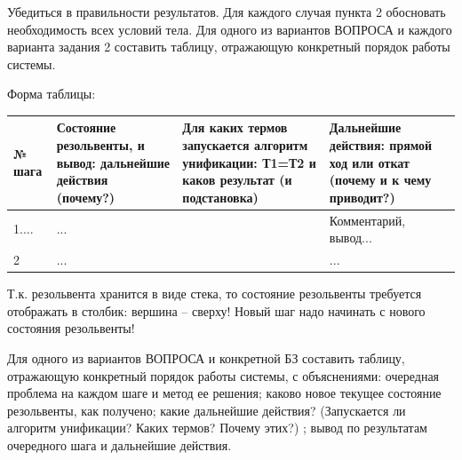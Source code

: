 Убедиться в правильности результатов. Для каждого случая пункта 2 обосновать необходимость всех условий тела.
Для одного из вариантов ВОПРОСА и каждого варианта задания 2 составить таблицу, отражающую конкретный порядок работы системы.

Форма таблицы:
\begin{tabularx}{\textwidth}{|p{1.2cm}|X|X|X|}
	\hline
	№ шага & Состояние резольвенты, и вывод: дальнейшие действия (почему?) & Для каких термов запускается алгоритм унификации: Т1=Т2 и каков \textbf{результат} (и подстановка) & Дальнейшие действия: прямой ход или откат (почему и к чему приводит?) \\
	\hline
	1....  & ...                                                           &                                                                                                    & Комментарий, вывод...                                                 \\
	\hline
	2      & ...                                                           &                                                                                                    & ...                                                                   \\
	\hline
\end{tabularx}

Т.к. резольвента хранится в виде стека, то состояние резольвенты требуется отображать в столбик: вершина -- сверху! Новый шаг надо начинать с нового состояния резольвенты!

Для одного из вариантов ВОПРОСА и конкретной БЗ составить таблицу, отражающую конкретный порядок работы системы, с объяснениями: очередная проблема на каждом шаге и метод ее решения; каково новое текущее состояние резольвенты, как получено; какие дальнейшие действия? (Запускается ли алгоритм унификации? Каких термов? Почему этих?) ; вывод по результатам очередного шага и дальнейшие действия.

\normalsize
